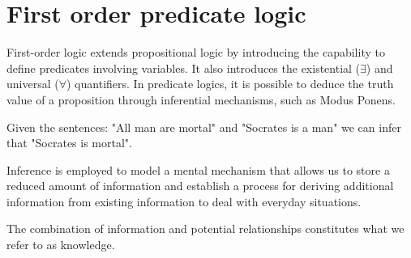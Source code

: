 \section{First order predicate logic}

First-order logic extends propositional logic by introducing the capability to define predicates involving variables. 
It also introduces the existential ($\exists$) and universal ($\forall$) quantifiers.
In predicate logics, it is possible to deduce the truth value of a proposition through inferential mechanisms, such as Modus Ponens.
\begin{example}
    Given the sentences: "All man are mortal" and "Socrates is a man" we can infer that "Socrates is mortal".
\end{example}
Inference is employed to model a mental mechanism that allows us to store a reduced amount of information and establish a process for deriving additional information from existing information to deal with everyday situations.
\begin{definition}
    The combination of information and potential relationships constitutes what we refer to as knowledge.
\end{definition}